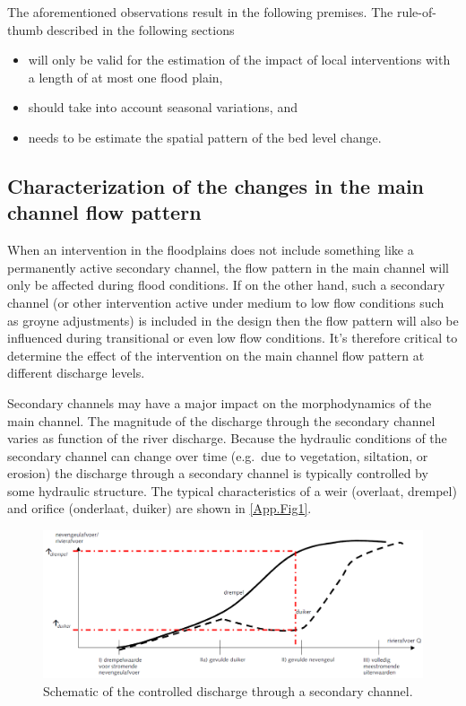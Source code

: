 The aforementioned observations result in the following premises.
The rule-of-thumb described in the following sections

\begin{itemize}
\item will only be valid for the estimation of the impact of local interventions with a length of at most one flood plain,

\item should take into account seasonal variations, and

\item needs to be estimate the spatial pattern of the bed level change.
\end{itemize}


\subsection{Characterization of the changes in the main channel flow pattern}

When an intervention in the floodplains does not include something like a permanently active secondary channel, the flow pattern in the main channel will only be affected during flood conditions.
If on the other hand, such a secondary channel (or other intervention active under medium to low flow conditions such as groyne adjustments) is included in the design then the flow pattern will also be influenced during transitional or even low flow conditions.
It's therefore critical to determine the effect of the intervention on the main channel flow pattern at different discharge levels.

Secondary channels may have a major impact on the morphodynamics of the main channel.
The magnitude of the discharge through the secondary channel varies as function of the river discharge.
Because the hydraulic conditions of the secondary channel can change over time (e.g.~due to vegetation, siltation, or erosion) the discharge through a secondary channel is typically controlled by some hydraulic structure.
The typical characteristics of a weir (overlaat, drempel) and orifice (onderlaat, duiker) are shown in \autoref{App.Fig1}.

\begin{figure}
\includegraphics[width=\columnwidth]{figures/Fig1.png}
\caption{Schematic of the controlled discharge through a secondary channel.}
\label{App.Fig1}
\end{figure}

